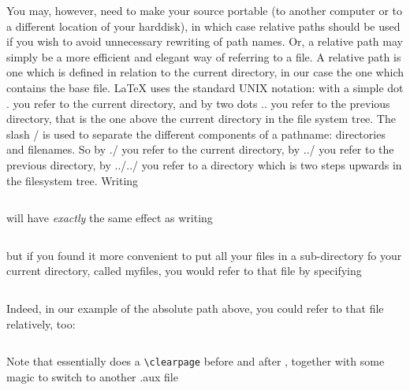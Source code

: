You may, however, need to make your source portable (to another computer or to a different location of your harddisk), in which case relative paths should be used if you wish to avoid unnecessary rewriting of path names. Or, a relative path may simply be a more efficient and elegant way of referring to a file. A relative path is one which is defined in relation to the current directory, in our case the one which contains the base file. LaTeX uses the standard UNIX notation: with a simple dot . you refer to the current directory, and by two dots .. you refer to the previous directory, that is the one above the current directory in the file system tree. The slash / is used to separate the different components of a pathname: directories and filenames. So by ./ you refer to the current directory, by ../ you refer to the previous directory, by ../../ you refer to a directory which is two steps upwards in the filesystem tree. Writing

\begin{lstlisting}[language={[LaTeX]TeX}]

\end{lstlisting}

will have \textit{exactly} the same effect as writing

\begin{lstlisting}[language={[LaTeX]TeX}]

\end{lstlisting}

but if you found it more convenient to put all your files in a sub-directory fo your current directory, called myfiles, you would refer to that file by specifying

\begin{lstlisting}[language={[LaTeX]TeX}]

\end{lstlisting}

Indeed, in our example of the absolute path above, you could refer to that file relatively, too:

\begin{lstlisting}[language={[LaTeX]TeX}]

\end{lstlisting}

Note that \lstinline[language={[LaTeX]TeX}]|| essentially does a \lstinline[language={[LaTeX]TeX}]|\clearpage| before and after \lstinline[language={[LaTeX]TeX}]||, together with some magic to switch to another .aux file